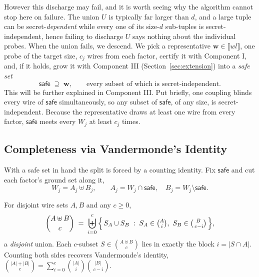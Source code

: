   However this discharge may fail, and it is worth seeing why the algorithm cannot stop here on
  failure. The union $U$ is typically far larger than $d$, and a large tuple can
  be secret-\emph{dependent} while every one of its size-$d$ sub-tuples is
  secret-independent, hence failing to discharge $U$ says nothing about the
  individual probes. When the union fails, we descend. We pick a
  representative $\mathbf{w} \in \llbracket wl \rrbracket$, one probe of
  the target size, $c_j$ wires from each factor, certify it with Component I,
  and, if it holds, grow it with Component III (Section~\ref{sec:extension}) into a
  \emph{safe set}
  \[
    \mathsf{safe} \;\supseteq\; \mathbf{w}, \qquad
    \text{every subset of which is secret-independent.}
  \]
  This will be further explained in Component III. Put briefly,
  one coupling
  blinds every wire of $\mathsf{safe}$ simultaneously, so any subset of
  $\mathsf{safe}$, of any size, is secret-independent. Because the
  representative draws at least one wire from every factor, $\mathsf{safe}$ meets
  every $W_j$ at least $c_j$ times.

  \subsection{Completeness via Vandermonde's Identity}
  \label{sec:vandermonde}

  With a safe set in hand the split is forced by a counting identity. Fix
  $\mathsf{safe}$ and cut each factor's ground set along it,
  \[
    W_j = A_j \uplus B_j, \qquad A_j = W_j \cap \mathsf{safe}, \quad B_j = W_j \setminus \mathsf{safe}.
  \]

  \begin{lemma}
  \label{lem:set-vandermonde}
  For disjoint wire sets $A, B$ and any $c \ge 0$,
  \[
    \binom{A \uplus B}{c} \;=\; \biguplus_{i=0}^{c}
      \Big\{\, S_A \cup S_B \;:\; S_A \in \tbinom{A}{i},\ S_B \in \tbinom{B}{\,c-i} \,\Big\},
  \]
  a \emph{disjoint} union. Each $c$-subset $S \in \binom{A \uplus B}{c}$ lies in exactly the block
  $i = |S \cap A|$. Counting both sides recovers Vandermonde's identity,
  $\binom{|A|+|B|}{c} = \sum_{i=0}^{c} \binom{|A|}{i} \binom{|B|}{\,c-i}$.
  \end{lemma}

